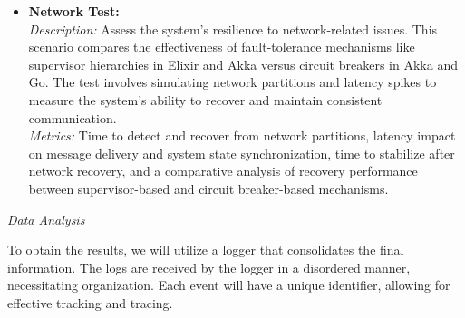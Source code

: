 \begin{itemize}
    \item \textbf{Network Test:} \\
    \textit{Description:} Assess the system's resilience to network-related issues. This scenario compares the effectiveness of fault-tolerance mechanisms like supervisor hierarchies in Elixir and Akka versus circuit breakers in Akka and Go. The test involves simulating network partitions and latency spikes to measure the system's ability to recover and maintain consistent communication. \\
    \textit{Metrics:} Time to detect and recover from network partitions, latency impact on message delivery and system state synchronization, time to stabilize after network recovery, and a comparative analysis of recovery performance between supervisor-based and circuit breaker-based mechanisms.
\end{itemize}

\textit{\underline{Data Analysis}}

To obtain the results, we will utilize a logger that consolidates the final information. The logs are received by the logger in a disordered manner, necessitating organization. Each event will have a unique identifier, allowing for effective tracking and tracing.
